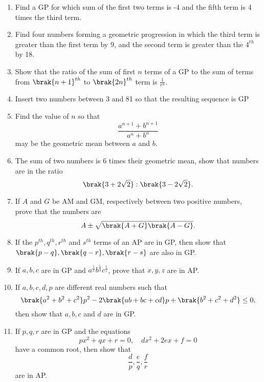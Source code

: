 \begin{enumerate}[label=\thesubsection.\arabic*.,ref=\thesubsection.\theenumi]
\item Find a GP  for which sum of the first two terms is -4 and the fifth term is 4 times the third term.
\item Find four numbers forming a geometric progression in which the third term is greater than the first term by 9, and the second term is greater than the $4^{th}$ by 18.
\item Show that the ratio of the sum of first $n$ terms of a GP  to the sum of terms from $\brak{n+1}^{th}$ to $\brak{2n}^{th}$ term is $\frac{1}{r^n}$.
\item Insert two numbers between 3 and 81 so that the resulting sequence is GP 
\item Find the value of $n$ so that $$\frac{a^{n + 1} + b^{n + 1}}{a^n + b^n}$$ may be the geometric mean between $a$ and $b$.
\item The sum of two numbers is 6 times their geometric mean, show that numbers are in the ratio $$\brak{3+2\sqrt{2}}:\brak{3-2\sqrt{2}}.$$
\item If $A$ and $G$ be AM  and GM, respectively between two positive numbers, prove that the numbers are $$A \pm \sqrt{\brak{A+G}\brak{A-G}}.$$
\item If the $p^{th}, q^{th}, r^{th}$ and $s^{th}$ terms of an AP are in GP, then show that $\brak{p-q},\brak{q-r},\brak{r-s}$ are also in GP.
\item If $a,b,c$ are in GP and $a^{\frac{1}{x}}b^{\frac{1}{y}}c^{\frac{1}{z}}$, prove that $x,y,z$ are in AP.
\item If $a, b, c, d, p$ are different real numbers such that 
	$$\brak{a^2+b^2+c^2}p^2-2\brak{ab+bc+cd}p+\brak{b^2+c^2+d^2} \le 0,$$ then show that $a,b,c$ and $d$ are in GP.
\item If $p,q,r$ are in GP and the equations 
	$$px^2+qx+r = 0, \quad dx^2+2ex+f = 0$$
	have a common root, then show that
	$$\frac{d}{p},\frac{e}{q},\frac{f}{r}$$ are in AP.
\end{enumerate}
